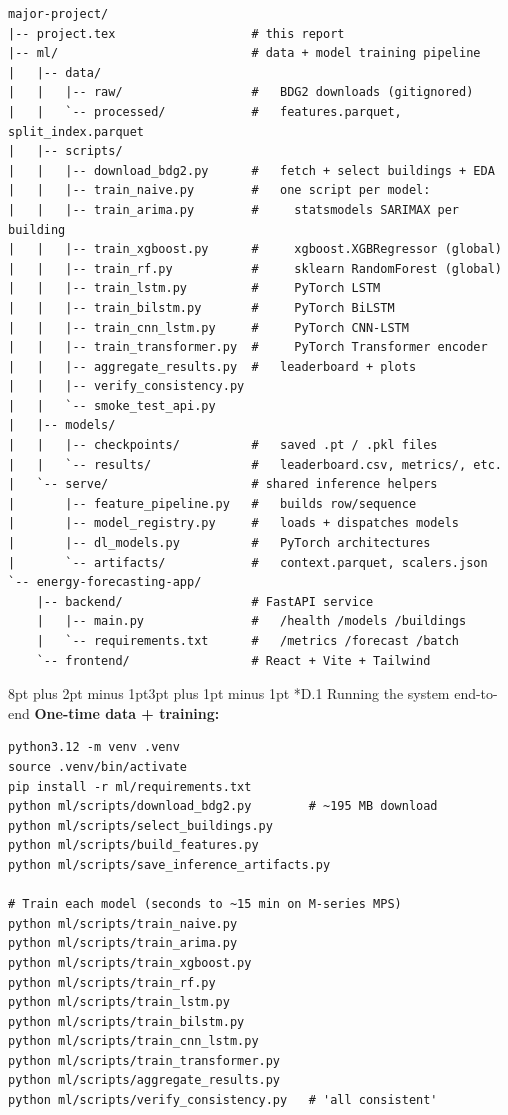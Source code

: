 \documentclass[12pt,a4paper,openany]{report}
\makeatletter
\renewcommand{\subsection}{\@startsection{subsection}{2}{\z@}%
  {8pt plus 2pt minus 1pt}{3pt plus 1pt minus 1pt}%
  {\normalfont\normalsize\bfseries}}
\makeatother
\begin{document}
{\small\begin{verbatim}
major-project/
|-- project.tex                   # this report
|-- ml/                           # data + model training pipeline
|   |-- data/
|   |   |-- raw/                  #   BDG2 downloads (gitignored)
|   |   `-- processed/            #   features.parquet, split_index.parquet
|   |-- scripts/
|   |   |-- download_bdg2.py      #   fetch + select buildings + EDA
|   |   |-- train_naive.py        #   one script per model:
|   |   |-- train_arima.py        #     statsmodels SARIMAX per building
|   |   |-- train_xgboost.py      #     xgboost.XGBRegressor (global)
|   |   |-- train_rf.py           #     sklearn RandomForest (global)
|   |   |-- train_lstm.py         #     PyTorch LSTM
|   |   |-- train_bilstm.py       #     PyTorch BiLSTM
|   |   |-- train_cnn_lstm.py     #     PyTorch CNN-LSTM
|   |   |-- train_transformer.py  #     PyTorch Transformer encoder
|   |   |-- aggregate_results.py  #   leaderboard + plots
|   |   |-- verify_consistency.py
|   |   `-- smoke_test_api.py
|   |-- models/
|   |   |-- checkpoints/          #   saved .pt / .pkl files
|   |   `-- results/              #   leaderboard.csv, metrics/, etc.
|   `-- serve/                    # shared inference helpers
|       |-- feature_pipeline.py   #   builds row/sequence
|       |-- model_registry.py     #   loads + dispatches models
|       |-- dl_models.py          #   PyTorch architectures
|       `-- artifacts/            #   context.parquet, scalers.json
`-- energy-forecasting-app/
    |-- backend/                  # FastAPI service
    |   |-- main.py               #   /health /models /buildings
    |   `-- requirements.txt      #   /metrics /forecast /batch
    `-- frontend/                 # React + Vite + Tailwind
\end{verbatim}}

\subsection*{D.1 Running the system end-to-end}
\textbf{One-time data + training:}
{\small\begin{verbatim}
python3.12 -m venv .venv
source .venv/bin/activate
pip install -r ml/requirements.txt
python ml/scripts/download_bdg2.py        # ~195 MB download
python ml/scripts/select_buildings.py
python ml/scripts/build_features.py
python ml/scripts/save_inference_artifacts.py

# Train each model (seconds to ~15 min on M-series MPS)
python ml/scripts/train_naive.py
python ml/scripts/train_arima.py
python ml/scripts/train_xgboost.py
python ml/scripts/train_rf.py
python ml/scripts/train_lstm.py
python ml/scripts/train_bilstm.py
python ml/scripts/train_cnn_lstm.py
python ml/scripts/train_transformer.py
python ml/scripts/aggregate_results.py
python ml/scripts/verify_consistency.py   # 'all consistent'
\end{verbatim}}
\end{document}
